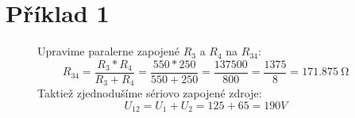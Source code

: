 \section{Příklad 1}


\begin{figure}[!ht]
\begin{center}
    
    Upravime paralerne zapojené $R_3$ a $R_4$ na $R_{34}$:
    \[ R_{34} = \frac{R_3 * R_4}{R_3 + R_4} = 
    \frac{550 * 250}{550 + 250 } = \frac{137500}{800} = 
    \frac{1375}{8} = \SI{171,875}{\ohm}\]
    Taktiež zjednodušíme sériovo zapojené zdroje:
    \[
        U_{12} = U_1 + U_2 = 125 + 65 = 190 V
    \]
\end{center}
\end{figure}
